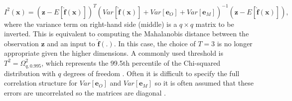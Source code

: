 \documentclass{article}
\newcommand{\numOutputs}{q}
\newcommand{\emulator}{\hat{f}}
\newcommand{\inputVec}{\mathbf{x}}
\newcommand{\obsqD}{\mathbf{z}}
\newcommand{\obsErrorqD}{\mathbf{e}_O}
\newcommand{\modelDiscqD}{\mathbf{e}_M}
\newcommand{\impl}{I}
\newcommand{\NROYspace}{\Omega}
\newcommand{\thresh}{T}
\begin{document}
\begin{equation}
    \label{eqn:impl}
    \impl^2(\inputVec) = \left(\obsqD - E\left[\mathbf{\emulator}(\inputVec)\right]\right)^T \left(Var\left[\mathbf{\emulator}(\inputVec)\right] + Var[\obsErrorqD] + Var[\modelDiscqD] \right)^{-1} \left(\obsqD - E\left[\mathbf{\emulator}(\inputVec)\right]\right),
\end{equation}
where the variance term on right-hand side (middle) is a $\numOutputs \times \numOutputs$ matrix to be inverted. This is equivalent to computing the Mahalanobis distance between the observation $\obsqD$ and an input to $\mathbf{\emulator}(.)$. In this case, the choice of $\thresh=3$ is no longer appropriate given the higher dimensions. A commonly used threshold is $\thresh^2=\NROYspace_{\numOutputs,0.995}^2$, which represents the 99.5th percentile of the Chi-squared distribution with $\numOutputs$ degrees of freedom \citep{Vernon2010,Andrianakis2015,Salter2019}. Often it is difficult to specify the full correlation structure for $Var[\obsErrorqD]$ and $Var[\modelDiscqD]$ so it is often assumed that these errors are uncorrelated so the matrices are diagonal \citep{Andrianakis2015}.
\end{document}
